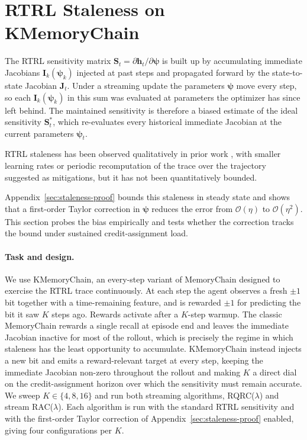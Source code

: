 \documentclass{article}
\begin{document}
\section{RTRL Staleness on KMemoryChain}
\label{sec:staleness}

The RTRL sensitivity matrix $\boldsymbol{S}_t = \partial \boldsymbol{h}_t / \partial \boldsymbol{\psi}$ is built up by accumulating immediate Jacobians $\boldsymbol{I}_k(\boldsymbol{\psi}_k)$ injected at past steps and propagated forward by the state-to-state Jacobian $\boldsymbol{J}_t$. Under a streaming update the parameters $\boldsymbol{\psi}$ move every step, so each $\boldsymbol{I}_k(\boldsymbol{\psi}_k)$ in this sum was evaluated at parameters the optimizer has since left behind. The maintained sensitivity is therefore a biased estimate of the ideal sensitivity $\boldsymbol{S}_t^\ast$, which re-evaluates every historical immediate Jacobian at the current parameters $\boldsymbol{\psi}_t$. 

RTRL staleness has been observed qualitatively in prior work \citep{williams1989learning,menick2021practical,irie2024exploring,elelimy2024real}, with smaller learning rates \citep{menick2021practical} or periodic recomputation of the trace over the trajectory \citep{elelimy2024real} suggested as mitigations, but it has not been quantitatively bounded.

Appendix~\ref{sec:staleness-proof} bounds this staleness in steady state and shows that a first-order Taylor correction in $\boldsymbol{\psi}$ reduces the error from $\mathcal{O}(\eta)$ to $\mathcal{O}(\eta^2)$. This section probes the bias empirically and tests whether the correction tracks the bound under sustained credit-assignment load.

\paragraph{Task and design.}
We use KMemoryChain, an every-step variant of MemoryChain designed to exercise the RTRL trace continuously. At each step the agent observes a fresh $\pm 1$ bit together with a time-remaining feature, and is rewarded $\pm 1$ for predicting the bit it saw $K$ steps ago. Rewards activate after a $K$-step warmup. The classic MemoryChain rewards a single recall at episode end and leaves the immediate Jacobian inactive for most of the rollout, which is precisely the regime in which staleness has the least opportunity to accumulate. KMemoryChain instead injects a new bit and emits a reward-relevant target at every step, keeping the immediate Jacobian non-zero throughout the rollout and making $K$ a direct dial on the credit-assignment horizon over which the sensitivity must remain accurate. We sweep $K \in \{4, 8, 16\}$ and run both streaming algorithms, RQRC($\lambda$) and stream RAC($\lambda$). Each algorithm is run with the standard RTRL sensitivity and with the first-order Taylor correction of Appendix~\ref{sec:staleness-proof} enabled, giving four configurations per $K$.
\end{document}
